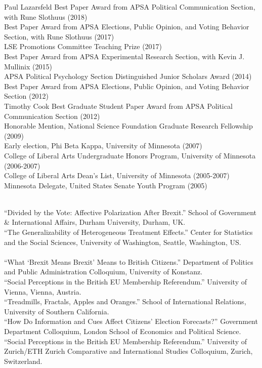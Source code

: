 \documentclass[12pt]{article}
\renewcommand{\section}[1]{\pagebreak[3]%
    \llap{\scshape\smash{\parbox[t]{\marginparwidth}{\raggedright {\color{lg}#1}}}}%
    \vspace{-\baselineskip}\par}
\newcommand{\topic}[1]{\pagebreak[3]\indent {\color{lg}{\footnotesize #1 }}\\}
\newcommand{\entry}[1]{\indent {\color{lg}\guillemotright}\hspace{2pt}#1\vspace{.25em}\\}
\begin{document}
{\section{Honors \&\\Awards}
	\entry{Paul Lazarsfeld Best Paper Award from APSA Political Communication Section, with Rune Slothuus (2018)}
    \entry{Best Paper Award from APSA Elections, Public Opinion, and Voting Behavior Section, with Rune Slothuus (2017)}
	\entry{LSE Promotions Committee Teaching Prize (2017)}
    \entry{Best Paper Award from APSA Experimental Research Section, with Kevin J. Mullinix (2015)}
	\entry{APSA Political Psychology Section Distinguished Junior Scholars Award (2014)}
	\entry{Best Paper Award from APSA Elections, Public Opinion, and Voting Behavior Section (2012)}
	\entry{Timothy Cook Best Graduate Student Paper Award from APSA Political Communication Section (2012)}
	\entry{Honorable Mention, National Science Foundation Graduate Research Fellowship (2009)}
	\entry{Early election, Phi Beta Kappa, University of Minnesota (2007)}
	\entry{College of Liberal Arts Undergraduate Honors Program, University of Minnesota (2006-2007)}
	\entry{College of Liberal Arts Dean's List, University of Minnesota (2005-2007)}
	\entry{Minnesota Delegate, United States Senate Youth Program (2005)}

\section{Invited\\Presentations\\\& Conference\\Papers}
	\topic{Invited Presentations (2018)}
    \entry{``Divided by the Vote: Affective Polarization After Brexit.'' School of Government & International Affairs, Durham University, Durham, UK.}
    \entry{``The Generalizability of Heterogeneous Treatment Effects.'' Center for Statistics and the Social Sciences, University of Washington, Seattle, Washington, US.}

    \topic{Invited Presentations (2017)}
    \entry{``What `Brexit Means Brexit' Means to British Citizens.'' Department of Politics and Public Administration Colloquium, University of Konstanz.}
    \entry{``Social Perceptions in the British EU Membership Referendum.'' University of Vienna, Vienna, Austria.}
    \entry{``Treadmills, Fractals, Apples and Oranges.'' School of International Relations, University of Southern California.}
    \entry{``How Do Information and Cues Affect Citizens' Election Forecasts?'' Government Department Colloquium, London School of Economics and Political Science.}
    \entry{``Social Perceptions in the British EU Membership Referendum.'' University of Zurich/ETH Zurich Comparative and International Studies Colloquium, Zurich, Switzerland.}
	
}
\end{document}
